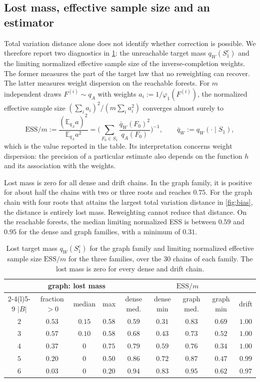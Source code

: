\documentclass[onefignum,onetabnum,nohypdvips]{siamart250211}
\numberwithin{theorem}{section}
\numberwithin{equation}{section}
\providecommand{\E}{}\renewcommand{\E}{\mathbb{E}}
\begin{document}
\subsection{Lost mass, effective sample size and an estimator}
Total variation distance alone does not identify whether correction
is possible. We therefore report two diagnostics in \cref{tab:lost}:
the unreachable target mass $q_W(S_1^c)$ and the limiting normalized
effective sample size of the inverse-completion weights. The former
measures the part of the target law that no reweighting can recover.
The latter measures weight dispersion on the reachable forests.
For $m$ independent draws $F^{(i)}\sim q_A$ with
weights $a_i:=1/\varphi_1(F^{(i)})$, the normalized effective sample size
$(\sum_ia_i)^2/(m\sum_ia_i^2)$ converges almost surely to
\[
\mathrm{ESS}/m:=\frac{(\E_{q_A}a)^2}{\E_{q_A}a^2}
=\Big(\sum_{F_0\in S_1}\frac{\bar q_W(F_0)^2}{q_A(F_0)}\Big)^{-1},
\qquad \bar q_W:=q_W(\cdot\mid S_1),
\]
which is the value reported in the table. Its interpretation concerns
weight dispersion: the precision of a particular estimate also
depends on the function $h$ and its association with the weights.

Lost mass is zero for all dense and drift chains. In the graph
family, it is positive for about half the chains with two or three
roots and reaches $0.75$. For the graph chain with four roots that
attains the largest total variation distance in \cref{fig:bias}, the
distance is entirely lost mass. Reweighting cannot reduce that
distance. On the reachable forests, the median limiting normalized
ESS is between $0.59$ and $0.95$ for the dense and graph families,
with a minimum of $0.31$.

\begin{table}[!htbp]
\caption{Lost target mass $q_W(S_1^c)$ for the graph family and
limiting normalized effective sample size $\mathrm{ESS}/m$ for the three
families, over the $30$ chains of each family. The lost mass is zero
for every dense and drift chain.}\label{tab:lost}
\centering
\footnotesize
\begin{tabular}{@{}ccccccccc@{}}
\toprule
& \multicolumn{3}{c}{graph: lost mass} & \multicolumn{5}{c}{$\mathrm{ESS}/m$}\\
\cmidrule(lr){2-4}\cmidrule(l){5-9}
$|B|$ & fraction $>0$ & median & max & dense med. & dense min & graph med. & graph min & drift\\
\midrule
$2$ & $0.53$ & $0.15$ & $0.58$ & $0.59$ & $0.31$ & $0.83$ & $0.69$ & $1.00$\\
$3$ & $0.57$ & $0.10$ & $0.58$ & $0.68$ & $0.43$ & $0.73$ & $0.52$ & $1.00$\\
$4$ & $0.37$ & $0$ & $0.75$ & $0.79$ & $0.59$ & $0.76$ & $0.34$ & $1.00$\\
$5$ & $0.20$ & $0$ & $0.50$ & $0.86$ & $0.72$ & $0.87$ & $0.47$ & $0.99$\\
$6$ & $0.03$ & $0$ & $0.20$ & $0.94$ & $0.83$ & $0.95$ & $0.62$ & $0.97$\\
\bottomrule
\end{tabular}
\end{table}
\end{document}

